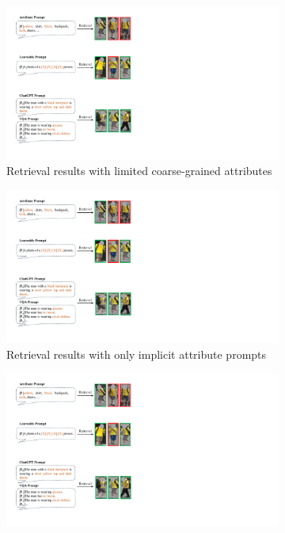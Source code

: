 \documentclass[letterpaper]{article} %
\begin{document}
\begin{figure}[t!]
  \centering
  \begin{subfigure}[t]{1\columnwidth}
		\centering
		\includegraphics[width=0.99\linewidth]{example_a.pdf}
        \vspace{-0.1cm}
		\caption{Retrieval results with limited coarse-grained attributes} 
        \vspace{0.1cm}
    \label{subfig:example_a}
  \end{subfigure}
  \begin{subfigure}[t]{1\columnwidth}
		\centering
		\includegraphics[width=0.99\linewidth]{example_b.pdf}
        \vspace{-0.1cm}
        \caption{Retrieval results with only implicit attribute prompts}
        \vspace{0.1cm}
    \label{subfig:example_b}
  \end{subfigure}
  \begin{subfigure}[t]{1\columnwidth}
		\centering
		\includegraphics[width=0.99\linewidth]{example_c.pdf}

\end{subfigure}
\end{figure}
\end{document}
